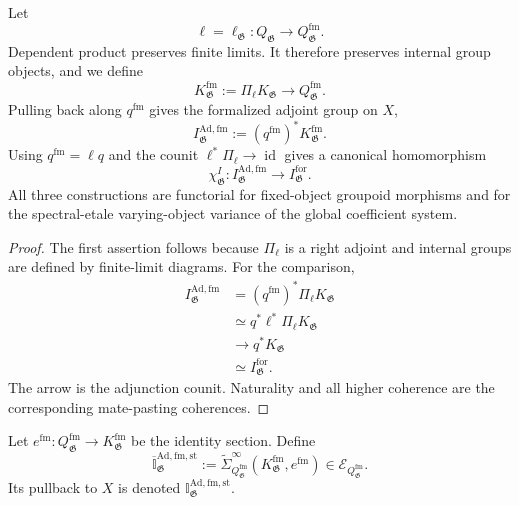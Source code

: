\begin{construction}
\label{con:as-formalized-adjoint-group}
Let
\[
    \ell=\ell_{\mathfrak G}:
    Q_{\mathfrak G}\longrightarrow Q_{\mathfrak G}^{\mathrm{fm}}.
\]
Dependent product preserves finite limits.  It therefore preserves internal
group objects, and we define
\[
\boxed{
    K_{\mathfrak G}^{\mathrm{fm}}
    :=
    \Pi_\ell K_{\mathfrak G}
    \longrightarrow
    Q_{\mathfrak G}^{\mathrm{fm}}.
}
\]
Pulling back along $q^{\mathrm{fm}}$ gives the formalized adjoint group on
$X$,
\[
\boxed{
    I_{\mathfrak G}^{\mathrm{Ad,fm}}
    :=
    (q^{\mathrm{fm}})^*
    K_{\mathfrak G}^{\mathrm{fm}}.
}
\]
Using $q^{\mathrm{fm}}=\ell q$ and the counit
$\ell^*\Pi_\ell\to\operatorname{id}$ gives a canonical homomorphism
\[
\boxed{
    \chi_{\mathfrak G}^{I}:
    I_{\mathfrak G}^{\mathrm{Ad,fm}}
    \longrightarrow
    I_{\mathfrak G}^{\mathrm{for}}.
}
\]
All three constructions are functorial for fixed-object groupoid morphisms
and for the spectral-etale varying-object variance of the global coefficient
system.
\end{construction}

\begin{proof}
The first assertion follows because $\Pi_\ell$ is a right adjoint and internal
groups are defined by finite-limit diagrams.  For the comparison,
\[
\begin{aligned}
I_{\mathfrak G}^{\mathrm{Ad,fm}}
&=
(q^{\mathrm{fm}})^*\Pi_\ell K_{\mathfrak G}\\
&\simeq
q^*\ell^*\Pi_\ell K_{\mathfrak G}\\
&\longrightarrow
q^*K_{\mathfrak G}\\
&\simeq
I_{\mathfrak G}^{\mathrm{for}}.
\end{aligned}
\]
The arrow is the adjunction counit.  Naturality and all higher coherence are
the corresponding mate-pasting coherences.
\end{proof}

\begin{definition}
\label{def:as-formalized-stable-adjoint}
Let $e^{\mathrm{fm}}:Q_{\mathfrak G}^{\mathrm{fm}}\to
K_{\mathfrak G}^{\mathrm{fm}}$ be the identity section.  Define
\[
\boxed{
    \overline{\mathbb I}_{\mathfrak G}^{\mathrm{Ad,fm,st}}
    :=
    \widetilde\Sigma^\infty_{Q_{\mathfrak G}^{\mathrm{fm}}}
    \left(
        K_{\mathfrak G}^{\mathrm{fm}},e^{\mathrm{fm}}
    \right)
    \in
    \mathcal E_{Q_{\mathfrak G}^{\mathrm{fm}}}.
}
\]
Its pullback to $X$ is denoted
$\mathbb I_{\mathfrak G}^{\mathrm{Ad,fm,st}}$.
\end{definition}

